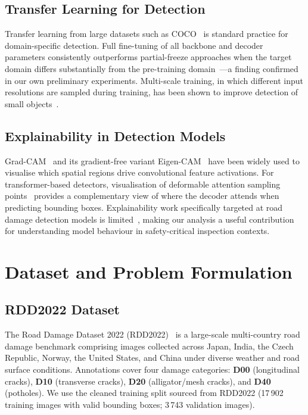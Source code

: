 \documentclass[conference]{IEEEtran}
\begin{document}
\subsection{Transfer Learning for Detection}

Transfer learning from large datasets such as COCO~\cite{lin2014coco} is standard
practice for domain-specific detection.
Full fine-tuning of all backbone and decoder parameters consistently outperforms
partial-freeze approaches when the target domain differs substantially from the
pre-training domain~\cite{zaidi2022survey}---a finding confirmed in our own
preliminary experiments.
Multi-scale training, in which different input resolutions are sampled during training,
has been shown to improve detection of small objects~\cite{lin2017fpn}.

\subsection{Explainability in Detection Models}

Grad-CAM~\cite{selvaraju2017gradcam} and its gradient-free variant
Eigen-CAM~\cite{muhammad2020eigencam} have been widely used to visualise which spatial
regions drive convolutional feature activations.
For transformer-based detectors, visualisation of deformable attention sampling
points~\cite{zhu2021deformable} provides a complementary view of where the decoder
attends when predicting bounding boxes.
Explainability work specifically targeted at road damage detection models is
limited~\cite{guo2025xai}, making our analysis a useful contribution for
understanding model behaviour in safety-critical inspection contexts.

\section{Dataset and Problem Formulation}
\label{sec:dataset}

\subsection{RDD2022 Dataset}

The Road Damage Dataset 2022 (RDD2022)~\cite{arya2022rdd} is a large-scale
multi-country road damage benchmark comprising images collected across Japan, India,
the Czech Republic, Norway, the United States, and China under diverse weather and
road surface conditions.
Annotations cover four damage categories:
\textbf{D00} (longitudinal cracks),
\textbf{D10} (transverse cracks),
\textbf{D20} (alligator/mesh cracks), and
\textbf{D40} (potholes).
We use the cleaned training split sourced from RDD2022 (17\,902 training images with
valid bounding boxes; 3\,743 validation images).
\end{document}
